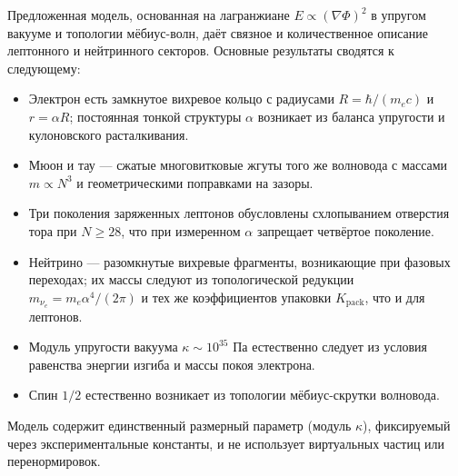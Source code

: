 \documentclass[12pt,a4paper]{article}
\begin{document}
Предложенная модель, основанная на лагранжиане $E \propto (\nabla\Phi)^2$ в упругом вакууме и топологии мёбиус-волн, даёт связное и количественное описание лептонного и нейтринного секторов. Основные результаты сводятся к следующему:
\begin{itemize}
    \item Электрон есть замкнутое вихревое кольцо с радиусами $R = \hbar/(m_e c)$ и $r = \alpha R$; постоянная тонкой структуры $\alpha$ возникает из баланса упругости и кулоновского расталкивания.
    \item Мюон и тау — сжатые многовитковые жгуты того же волновода с массами $m \propto N^3$ и геометрическими поправками на зазоры.
    \item Три поколения заряженных лептонов обусловлены схлопыванием отверстия тора при $N \ge 28$, что при измеренном $\alpha$ запрещает четвёртое поколение.
    \item Нейтрино — разомкнутые вихревые фрагменты, возникающие при фазовых переходах; их массы следуют из топологической редукции $m_{\nu_e} = m_e \alpha^4 / (2\pi)$ и тех же коэффициентов упаковки $K_{\text{pack}}$, что и для лептонов.
    \item Модуль упругости вакуума $\kappa \sim 10^{35}$ Па естественно следует из условия равенства энергии изгиба и массы покоя электрона.
    \item Спин $1/2$ естественно возникает из топологии мёбиус-скрутки волновода.
\end{itemize}

Модель содержит единственный размерный параметр (модуль $\kappa$), фиксируемый через экспериментальные константы, и не использует виртуальных частиц или перенормировок.
\end{document}
